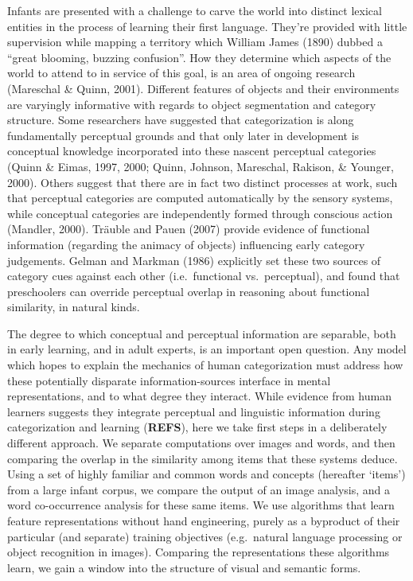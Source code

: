 \documentclass[10pt, letterpaper]{article}
\begin{document}
Infants are presented with a challenge to carve the world into distinct
lexical entities in the process of learning their first language.
They're provided with little supervision while mapping a territory which
William James (1890) dubbed a ``great blooming, buzzing confusion''. How
they determine which aspects of the world to attend to in service of
this goal, is an area of ongoing research (Mareschal \& Quinn, 2001).
Different features of objects and their environments are varyingly
informative with regards to object segmentation and category structure.
Some researchers have suggested that categorization is along
fundamentally perceptual grounds and that only later in development is
conceptual knowledge incorporated into these nascent perceptual
categories (Quinn \& Eimas, 1997, 2000; Quinn, Johnson, Mareschal,
Rakison, \& Younger, 2000). Others suggest that there are in fact two
distinct processes at work, such that perceptual categories are computed
automatically by the sensory systems, while conceptual categories are
independently formed through conscious action (Mandler, 2000). Träuble
and Pauen (2007) provide evidence of functional information (regarding
the animacy of objects) influencing early category judgements. Gelman
and Markman (1986) explicitly set these two sources of category cues
against each other (i.e.~functional vs.~perceptual), and found that
preschoolers can override perceptual overlap in reasoning about
functional similarity, in natural kinds.

The degree to which conceptual and perceptual information are separable,
both in early learning, and in adult experts, is an important open
question. Any model which hopes to explain the mechanics of human
categorization must address how these potentially disparate
information-sources interface in mental representations, and to what
degree they interact. While evidence from human learners suggests they
integrate perceptual and linguistic information during categorization
and learning (\textbf{REFS}), here we take first steps in a deliberately
different approach. We separate computations over images and words, and
then comparing the overlap in the similarity among items that these
systems deduce. Using a set of highly familiar and common words and
concepts (hereafter `items') from a large infant corpus, we compare the
output of an image analysis, and a word co-occurrence analysis for these
same items. We use algorithms that learn feature representations without
hand engineering, purely as a byproduct of their particular (and
separate) training objectives (e.g.~natural language processing or
object recognition in images). Comparing the representations these
algorithms learn, we gain a window into the structure of visual and
semantic forms.
\end{document}
